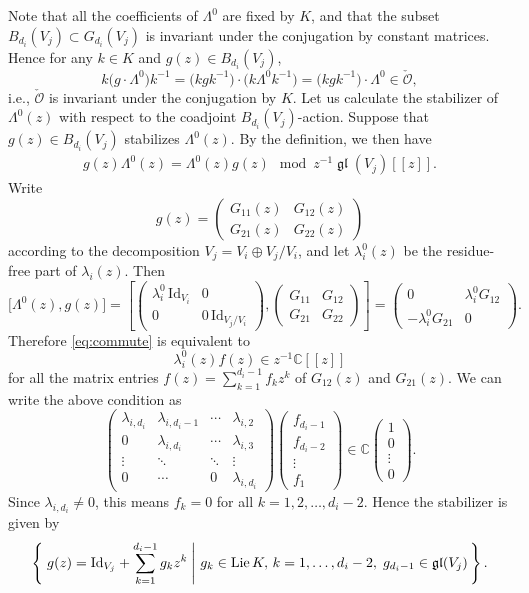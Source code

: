 \documentclass[pdftex]{sigma}
\numberwithin{equation}{section}
\theoremstyle{definition}
\newcommand{\C}{\mathbb{C}} %
\newcommand{\gl}{\operatorname{\mathfrak{gl}}}
\newcommand{\Lie}{\operatorname{Lie}} %
\newcommand{\unit}{\mathrm{Id}}
\newcommand{\lset}[2]%
{\left\{ \, \left. #1 \hspace{0.25em} \right| \, #2 \, \right\} }
\newcommand{\bO}{\mathcal{O}}
\begin{document}
Note that all the coef\/f\/icients of $\Lambda^0$ are f\/ixed by $K$,
and that the subset $B_{d_i}(V_j) \subset G_{d_i}(V_j)$ is invariant under
the conjugation by constant matrices.
Hence for any $k \in K$ and $g(z) \in B_{d_i}(V_j)$,
\[
k \big(g \cdot \Lambda^0\big) k^{-1} = \big(kgk^{-1}\big) \cdot \big(k\Lambda^0k^{-1}\big)
=\big(kgk^{-1}\big) \cdot \Lambda^0 \in \check{\bO},
\]
i.e., $\check{\bO}$ is invariant under the conjugation by $K$.
Let us calculate the stabilizer of $\Lambda^0(z)$
with respect to the coadjoint $B_{d_i}(V_j)$-action.
Suppose that
$g(z) \in B_{d_i}(V_j)$ stabilizes $\Lambda^0(z)$.
By the def\/inition, we then have
\begin{gather}\label{eq:commute}
g(z)\Lambda^0(z) = \Lambda^0(z)g(z) \mod z^{-1}\gl(V_j)[[z]].
\end{gather}
Write
\[
g(z) =
\begin{pmatrix}
G_{11}(z) & G_{12}(z) \\ G_{21}(z) & G_{22}(z)
\end{pmatrix}
\]
according to the decomposition $V_j = V_i \oplus V_j/V_i$,
and let $\lambda_i^0(z)$ be the residue-free part of $\lambda_i(z)$.
Then
\[
\big[ \Lambda^0(z),g(z) \big] =
\left[
\begin{pmatrix}
\lambda_i^0\,\unit_{V_i} & 0 \\ 0 & 0\,\unit_{V_j/V_i}
\end{pmatrix},
\begin{pmatrix}
G_{11} & G_{12} \\ G_{21} & G_{22}
\end{pmatrix}
\right] =
\begin{pmatrix}
0 & \lambda_i^0G_{12} \\ -\lambda_i^0G_{21} & 0
\end{pmatrix}.
\]
Therefore \eqref{eq:commute} is equivalent to
\[
\lambda_i^0(z)f(z) \in z^{-1}\C[[z]]
\]
for all the matrix entries $f(z)=\sum\limits_{k=1}^{d_i-1}f_kz^k$
of $G_{12}(z)$ and $G_{21}(z)$.
We can write the above condition as
\[
\begin{pmatrix}
\lambda_{i,d_i} & \lambda_{i,d_i-1} & \cdots & \lambda_{i,2} \\
0 & \lambda_{i,d_i} & \cdots & \lambda_{i,3} \\
\vdots & \ddots & \ddots & \vdots \\
0 & \cdots & 0 & \lambda_{i,d_i}
\end{pmatrix}
\begin{pmatrix}
f_{d_i-1} \\
f_{d_i-2} \\
\vdots \\
f_1
\end{pmatrix}
\in \C
\begin{pmatrix}
1 \\
0 \\
\vdots \\
0
\end{pmatrix}.
\]
Since $\lambda_{i,d_i} \neq 0$, this means
$f_k =0$ for all $k=1,2,\dots ,d_i-2$.
Hence the stabilizer is given by
\[
\lset{g(z) = \unit_{V_j} + \sum_{k=1}^{d_i-1} g_k z^k}{%
g_k \in \Lie K,\, k=1,\dots ,d_i-2, \; g_{d_i-1} \in \gl(V_j)}.
\]
\end{document}
